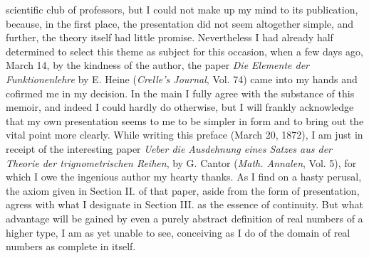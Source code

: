 \documentclass[oneside,12pt]{book}
\begin{document}
scientific club of professors, but I could not make up my mind to its publication, because, in the first place, the presentation did not seem altogether simple, and further, the 
theory itself had little promise. Nevertheless I had already half determined to select this theme as subject for this occasion, when a few days ago, March 14, by the kindness
of the author, the paper \textit{Die Elemente der Funktionenlehre} by E. Heine (\textit{Crelle's Journal}, Vol. 74) came into my hands and cofirmed me in my decision. In the main
I fully agree with the substance of this memoir, and indeed I could hardly do otherwise, but I will frankly acknowledge that my own presentation seems to me to be simpler in form
and to bring out the vital point more clearly. While writing this preface (March 20, 1872), I am just in receipt of the interesting paper \textit{Ueber die Ausdehnung eines Satzes aus 
der Theorie der trignometrischen Reihen}, by G. Cantor (\textit{Math. Annalen}, Vol. 5), for which I owe the ingenious author my hearty thanks. As I find on a hasty perusal, the
axiom given in Section II. of that paper, aside from the form of presentation, agress with what I designate in Section III. as the essence of continuity. But what 
advantage will be gained by even a purely abstract definition of real numbers of a higher type, I am as yet unable to see, conceiving as I do of the domain of real numbers
as complete in itself. \par 
\end{document}
